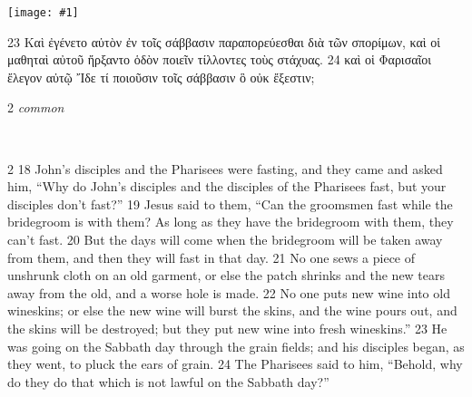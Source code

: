 \documentclass[10pt,a5paper,twoside,twocolumn]{book}
\newcommand{\fig}[1]{\texttt{[image: \#1]}\label{fig:#1}}
\newcommand*\cleartoleftpage{%
  \ifodd\value{page}\hbox{}\clearpage\fi
}
\newcommand{\separator}{\hspace{0.27\textwidth}\noindent\makebox[\linewidth]{\resizebox{0.3333\linewidth}{1pt}{$\bullet$}}\bigskip}
\newenvironment{facing}{\cleartoleftpage}{\clearpage\pagebreak}
\newenvironment{help}{\pagebreak}{}
\newenvironment{helpsec}{\begin{minipage}[t]{\textwidth}\begin{multicols}{2}}{\end{multicols}\end{minipage}}
\newenvironment{vocab}{\begin{helpsec}}{\end{helpsec}}
\newenvironment{translation}{\separator\\\begin{helpsec}\footnotesize}{\end{helpsec}}
\begin{document}
\fig{02-23} %

	23 Καὶ ἐγένετο αὐτὸν ἐν τοῖς σάββασιν παραπορεύεσθαι διὰ τῶν σπορίμων, καὶ οἱ μαθηταὶ αὐτοῦ ἤρξαντο ὁδὸν ποιεῖν τίλλοντες τοὺς στάχυας. 24 καὶ οἱ Φαρισαῖοι ἔλεγον αὐτῷ Ἴδε τί ποιοῦσιν τοῖς σάββασιν ὃ οὐκ ἔξεστιν; 



\begin{facing}
\begin{help}
\begin{vocab}
\emph{common}\\

\end{vocab}
\begin{translation}
 18 John's disciples and the Pharisees were fasting, and they came and asked him, ``Why do John's disciples and the disciples of the Pharisees fast, but your disciples don't fast?''
19 Jesus said to them, ``Can the groomsmen fast while the bridegroom is with them? As long as they have the bridegroom with them, they can't fast. 20  But the days will come when the bridegroom will be taken away from them, and then they will fast in that day. 21  No one sews a piece of unshrunk cloth on an old garment, or else the patch shrinks and the new tears away from the old, and a worse hole is made. 22  No one puts new wine into old wineskins; or else the new wine will burst the skins, and the wine pours out, and the skins will be destroyed; but they put new wine into fresh wineskins.''
23 He was going on the Sabbath day through the grain fields; and his disciples began, as they went, to pluck the ears of grain. 24 The Pharisees said to him, ``Behold, why do they do that which is not lawful on the Sabbath day?'' 

\end{translation}
\end{help}
\end{facing}

\end{document}
